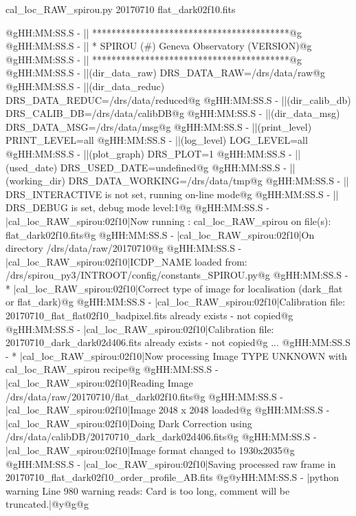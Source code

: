 \begin{cmdbox}[title={example}]
cal_loc_RAW_spirou.py 20170710 flat_dark02f10.fits
\end{cmdbox}
\begin{cmdboxprintspecial}[fontupper=\tiny, fontlower=\tiny]
@gHH:MM:SS.S -   || *****************************************@g
@gHH:MM:SS.S -   || * SPIROU \@(#) Geneva Observatory (VERSION)@g
@gHH:MM:SS.S -   || *****************************************@g
@gHH:MM:SS.S -   ||(dir_data_raw)      DRS_DATA_RAW=/drs/data/raw@g
@gHH:MM:SS.S -   ||(dir_data_reduc)    DRS_DATA_REDUC=/drs/data/reduced@g
@gHH:MM:SS.S -   ||(dir_calib_db)      DRS_CALIB_DB=/drs/data/calibDB@g
@gHH:MM:SS.S -   ||(dir_data_msg)      DRS_DATA_MSG=/drs/data/msg@g
@gHH:MM:SS.S -   ||(print_level)       PRINT_LEVEL=all         %
@gHH:MM:SS.S -   ||(log_level)         LOG_LEVEL=all         %
@gHH:MM:SS.S -   ||(plot_graph)        DRS_PLOT=1            %
@gHH:MM:SS.S -   ||(used_date)         DRS_USED_DATE=undefined@g
@gHH:MM:SS.S -   ||(working_dir)       DRS_DATA_WORKING=/drs/data/tmp@g
@gHH:MM:SS.S -   ||                    DRS_INTERACTIVE is not set, running on-line mode@g
@gHH:MM:SS.S -   ||                    DRS_DEBUG is set, debug mode level:1@g
@gHH:MM:SS.S -   |cal_loc_RAW_spirou:02f10|Now running : cal_loc_RAW_spirou on file(s): flat_dark02f10.fits@g
@gHH:MM:SS.S -   |cal_loc_RAW_spirou:02f10|On directory /drs/data/raw/20170710@g
@gHH:MM:SS.S -   |cal_loc_RAW_spirou:02f10|ICDP_NAME loaded from: /drs/spirou_py3/INTROOT/config/constants_SPIROU.py@g
@gHH:MM:SS.S - * |cal_loc_RAW_spirou:02f10|Correct type of image for localisation (dark_flat or flat_dark)@g
@gHH:MM:SS.S -   |cal_loc_RAW_spirou:02f10|Calibration file: 20170710_flat_flat02f10_badpixel.fits already exists - not copied@g
@gHH:MM:SS.S -   |cal_loc_RAW_spirou:02f10|Calibration file: 20170710_dark_dark02d406.fits already exists - not copied@g
...
@gHH:MM:SS.S - * |cal_loc_RAW_spirou:02f10|Now processing Image TYPE UNKNOWN with cal_loc_RAW_spirou recipe@g
@gHH:MM:SS.S -   |cal_loc_RAW_spirou:02f10|Reading Image /drs/data/raw/20170710/flat_dark02f10.fits@g
@gHH:MM:SS.S -   |cal_loc_RAW_spirou:02f10|Image 2048 x 2048 loaded@g
@gHH:MM:SS.S -   |cal_loc_RAW_spirou:02f10|Doing Dark Correction using /drs/data/calibDB/20170710_dark_dark02d406.fits@g
@gHH:MM:SS.S -   |cal_loc_RAW_spirou:02f10|Image format changed to 1930x2035@g
@gHH:MM:SS.S -   |cal_loc_RAW_spirou:02f10|Saving processed raw frame in 20170710_flat_dark02f10_order_profile_AB.fits
@g@yHH:MM:SS.S - \@ |python warning Line 980  warning reads: Card is too long, comment will be truncated.|@y@g@g

\end{cmdboxprintspecial}

